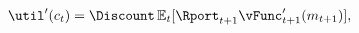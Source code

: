   \begin{equation}\begin{gathered}\begin{aligned}
    \util^{\prime}({c}_{t})  & = \Discount \Ex_{t} [{\Rport}_{t+1} \vFunc^{\prime}_{t+1}({m}_{t+1})] \label{eq:valfuncFOCRtilde},
  \end{aligned}\end{gathered}\end{equation}
